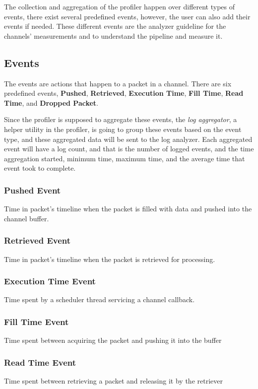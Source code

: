 The collection and aggregation of the profiler happen over different types of  events, there exist several
predefined events, however, the user can also add their events if needed. These different events are
the analyzer guideline for the channels' measurements and to understand the pipeline and measure it.

\subsection{Events}\label{sec:events}
The events are actions that happen to a packet in a channel. There are six predefined events, \textbf{Pushed},
\textbf{Retrieved}, \textbf{Execution Time}, \textbf{Fill Time}, \textbf{Read Time}, and \textbf{Dropped Packet}.

Since the profiler is supposed to aggregate these events, the \textit{log aggregator}, a helper utility in the profiler, is going to group these events
based on the event type, and these aggregated data will be sent to the log analyzer. Each aggregated event will have
a log count, and that is the number of logged events, and the time aggregation started, minimum time,
maximum time, and the average time that event took to complete.

\subsubsection{Pushed Event}\label{sec:pushed_event}
Time in packet's timeline when the packet is filled with data and pushed into the channel buffer.

\subsubsection{Retrieved Event}\label{sec:retrieved_event}
Time in packet's timeline when the packet is retrieved for processing.

\subsubsection{Execution Time Event}
Time spent by a scheduler thread servicing a channel callback.

\subsubsection{Fill Time Event}
Time spent between acquiring the packet and pushing it into the buffer

\subsubsection{Read Time Event}\label{sec:read_time_event}
Time spent between retrieving a packet and releasing it by the retriever

